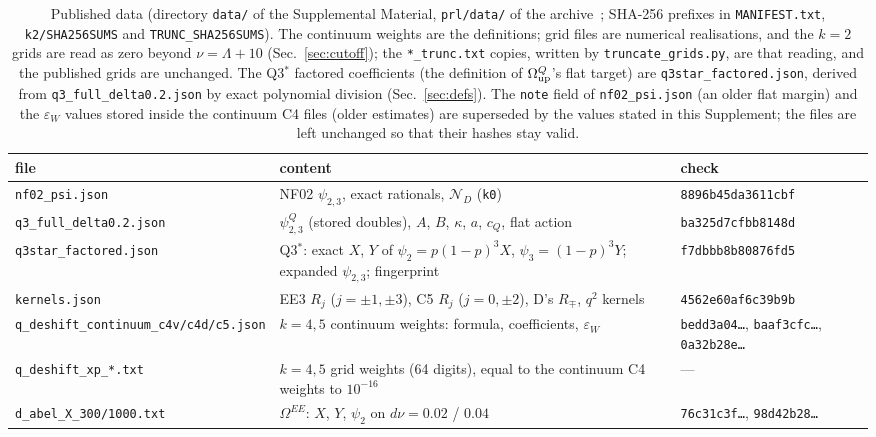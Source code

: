 \documentclass[aps,prl,onecolumn,superscriptaddress,nofootinbib]{revtex4-2}
\begin{document}
\begin{table}[!htbp]
\caption{\label{tab:data}Published data (directory \texttt{data/} of the Supplemental
Material, \texttt{prl/data/} of the archive~\cite{Zenodo}; SHA-256 prefixes in \texttt{MANIFEST.txt}, \texttt{k2/SHA256SUMS} and \texttt{TRUNC\_SHA256SUMS}). The continuum weights are
the definitions; grid files are numerical realisations, and the $k=2$ grids are read as zero beyond $\nu=\Lambda+10$
(Sec.~\ref{sec:cutoff}); the \texttt{*\_trunc.txt} copies, written by \texttt{truncate\_grids.py}, are that reading, and the
published grids are unchanged. The Q3$^*$ factored coefficients (the definition of $\Omega^Q_{\rm up}$'s
flat target) are \texttt{q3star\_factored.json}, derived from \texttt{q3\_full\_delta0.2.json} by exact
polynomial division (Sec.~\ref{sec:defs}). The \texttt{note} field of \texttt{nf02\_psi.json} (an older flat margin) and the
$\varepsilon_W$ values stored inside the continuum C4 files (older estimates) are superseded by the values stated in this
Supplement; the files are left unchanged so that their hashes stay valid.}
\footnotesize
\begin{ruledtabular}
\begin{tabular}{L{4.4cm}L{8.4cm}L{3.2cm}}
file & content & check\\\hline
\texttt{nf02\_psi.json} & NF02 $\psi_{2,3}$, exact rationals, $\mathcal N_D$ (\texttt{k0}) & \texttt{8896b45da3611cbf}\\
\texttt{q3\_full\_delta0.2.json} & $\psi_{2,3}^Q$ (stored doubles), $A$, $B$, $\kappa$, $a$, $c_Q$, flat action & \texttt{ba325d7cfbb8148d}\\
\texttt{q3star\_factored.json} & Q3$^*$: exact $X$, $Y$ of $\psi_2=p(1-p)^3X$, $\psi_3=(1-p)^3Y$; expanded $\psi_{2,3}$; fingerprint & \texttt{f7dbbb8b80876fd5}\\
\texttt{kernels.json} & EE3 $R_j$ ($j=\pm1,\pm3$), C5 $R_j$ ($j=0,\pm2$), D's $R_\mp$, $q^2$ kernels & \texttt{4562e60af6c39b9b}\\
\texttt{q\_deshift\_continuum\_}\allowbreak\texttt{c4v/c4d/c5.json} & $k=4,5$ continuum weights: formula, coefficients, $\varepsilon_W$ & \texttt{bedd3a04\dots}, \texttt{baaf3cfc\dots}, \texttt{0a32b28e\dots}\\
\texttt{q\_deshift\_xp\_*.txt} & $k=4,5$ grid weights (64 digits), equal to the continuum C4 weights to $10^{-16}$ & ---\\
\texttt{d\_abel\_X\_300/1000.txt} & $\Omega^{EE}$: $X$, $Y$, $\psi_2$ on $d\nu=0.02$ / $0.04$ & \texttt{76c31c3f\dots}, \texttt{98d42b28\dots}\\

\end{tabular}
\end{ruledtabular}
\end{table}
\end{document}
